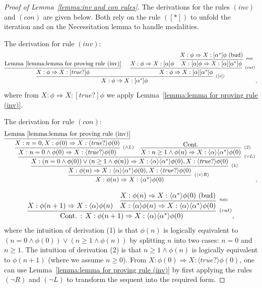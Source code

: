 \documentclass[manuscript,screen]{acmart}
\newcommand{\la}[0]{\langle}
\newcommand{\ra}[0]{\rangle}
\newcommand{\true}[0]{\mathit{true}}
\DeclareMathOperator{\seq}{;}
\DeclareMathOperator{\cho}{\cup}
\newcommand{\lup}[0]{*}
\newcommand{\Nec}[0]{\textit{nec}}
\begin{document}
\begin{proof}[Proof of Lemma~\ref{lemma:inv and con rules}]
The derivations for the rules $(\textit{inv})$ and $(\textit{con})$ are given below. Both rely on the rule $([\lup])$ to unfold the iteration and on the Necessitation lemma to handle modalities. 

The derivation for rule $(inv)$:
$$
\infer[^{([\lup])}]
{X : \phi \Rightarrow X : [\alpha^*]\phi}
{
        \infer[]
        {X : \phi\Rightarrow X : [\true?]\phi}
        {
            \mbox{Lemma~\ref{lemma:lemma for proving rule (inv)}}
        }
        &
        \infer[^{(cut)}]
        {X : \phi\Rightarrow X : [\alpha][\alpha^*]\phi}
        {
            X : \phi\Rightarrow X : [\alpha]\phi
            &
            \infer[^{\Nec}]
            {X : [\alpha]\phi\Rightarrow X : [\alpha][\alpha^*]\phi}
            {
                X : \phi\Rightarrow X : [\alpha^*]\phi\mbox{ (bud)}
            }
        }
},
$$
where from $X : \phi\Rightarrow X : [\true?]\phi$ we apply Lemma~\ref{lemma:lemma for proving rule (inv)}. 

The derivation for rule $(\textit{con})$:
$$
    \infer[^{(\la\lup\ra R)}]
    {X : \phi(n)\Rightarrow X : \la\alpha^*\ra\phi(0)}
    {
        \infer[^{(1)}]
        {X : \phi(n)\Rightarrow X : \la\alpha\ra\la\alpha^*\ra\phi(0), X : \la\true?\ra\phi(0)}
        {
            \infer[^{(\vee L)}]
            {X : (n = 0\wedge \phi(0))\vee (n \ge 1\wedge \phi(n))\Rightarrow X : \la\alpha\ra\la\alpha^*\ra\phi(0), X : \la\true?\ra\phi(0)}
            {
                \infer[^{(\wedge L)}]
                {X : n=0\wedge \phi(0)\Rightarrow X : \la\true?\ra\phi(0)}
                {
                    \infer[]
                    {X : n=0, X : \phi(0)\Rightarrow X : \la\true?\ra\phi(0)}
                    {\mbox{Lemma~\ref{lemma:lemma for proving rule (inv)}}}
                }
                &
                \infer[^{(2)}]
                {X : n\ge 1\wedge\phi(n)\Rightarrow X : \la\alpha\ra\la\alpha^\lup\ra\phi(0)}
                {\mbox{Cont.}}
            }
        }
    }, 
$$

$$
\infer[^{(cut)}]
{\mbox{Cont. : }X : \phi(n+1)\Rightarrow X : \la\alpha\ra\la\alpha^*\ra\phi(0)}
{
    X : \phi(n+1)\Rightarrow X : \la\alpha\ra\phi(n)
    &
    \infer[^{\Nec}]
    {X : \la\alpha\ra\phi(n)\Rightarrow X : \la\alpha\ra\la\alpha^*\ra\phi(0)}
    {
        X : \phi(n)\Rightarrow X : \la\alpha^*\ra\phi(0)\mbox{ (bud)}
    }
}, 
$$
where the intuition of derivation (1) is that $\phi(n)$ is logically equivalent to $(n=0\wedge \phi(0))\vee (n\ge 1\wedge \phi(n))$ by splitting $n$ into two cases: $n = 0$ and $n \ge 1$. 
The intuition of derivation (2) is that $n\ge 1\wedge \phi(n)$ is logically equivalent to $\phi(n+1)$ (where we assume $n\ge 0$). From $X : \phi(0)\Rightarrow X : \la\true?\ra\phi(0)$, one can use Lemma~\ref{lemma:lemma for proving rule (inv)} by first applying the rules $(\neg R)$ and $(\neg L)$ to transform the sequent into the required form. 


\end{proof}
\end{document}
